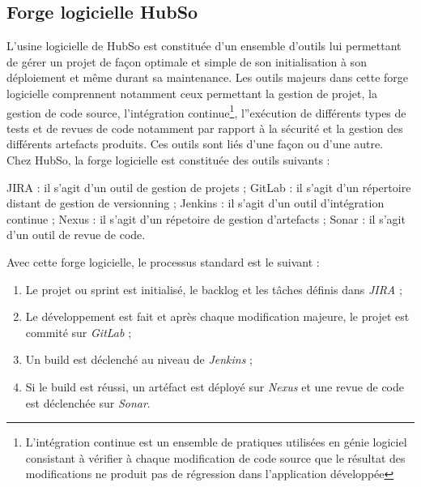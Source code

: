 \subsection{Forge logicielle HubSo}
L'usine logicielle de HubSo est constituée d'un ensemble d'outils lui permettant de gérer un projet de façon optimale et simple de son initialisation à son déploiement et même durant sa maintenance. Les outils majeurs
dans cette forge logicielle comprennent notamment ceux permettant la gestion de projet, la gestion de code source, l'intégration continue\footnote{L'intégration continue est un ensemble de pratiques utilisées en génie logiciel consistant à vérifier à chaque modification de code source que le résultat des modifications ne produit pas de régression dans l'application développée}, l''exécution de différents types de tests et de revues de code notamment par rapport à la sécurité et  la gestion des différents artefacts produits. Ces outils sont liés d'une façon ou d'une autre.\\
Chez HubSo, la forge logicielle est constituée des outils suivants :
\begin{itemize}
	\itemcheck JIRA : il s'agit d'un outil de gestion de projets ;
	\itemcheck GitLab : il s'agit d'un répertoire distant de gestion de versionning ;
	\itemcheck Jenkins : il s'agit d'un outil d'intégration continue ;
	\itemcheck Nexus : il s'agit d'un répetoire de gestion d'artefacts ;
	\itemcheck Sonar : il s'agit d'un outil de revue de code. 
\end{itemize}
Avec cette forge logicielle, le processus standard est le suivant :
\begin{enumerate}
	\item Le projet ou sprint est initialisé, le backlog et les tâches définis dans \textit{JIRA} ;
	\item Le développement est fait et après chaque modification majeure, le projet est commité sur \textit{GitLab} ;
	\item Un build est déclenché au niveau de \textit{Jenkins} ;
	\item Si le build est réussi, un artéfact est déployé sur \textit{Nexus} et une revue de code est déclenchée sur \textit{Sonar}.
\end{enumerate}
